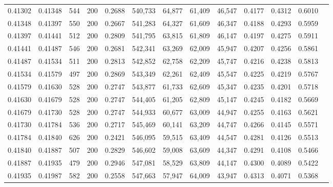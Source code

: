 \begin{tabular}{rrrrrrrrrrrrr}
0.41302 & 0.41348 &    544 & 200 &                                     0.2688 & 540,733 &  64,877 &  61,409 &  46,547 & 0.4177 & 0.4312 & 0.6010 \\
0.41348 & 0.41397 &    550 & 200 &                                     0.2667 & 541,283 &  64,327 &  61,609 &  46,347 & 0.4188 & 0.4293 & 0.5959 \\
0.41397 & 0.41441 &    512 & 200 &                                     0.2809 & 541,795 &  63,815 &  61,809 &  46,147 & 0.4197 & 0.4275 & 0.5911 \\
0.41441 & 0.41487 &    546 & 200 &                                     0.2681 & 542,341 &  63,269 &  62,009 &  45,947 & 0.4207 & 0.4256 & 0.5861 \\
0.41487 & 0.41534 &    511 & 200 &                                     0.2813 & 542,852 &  62,758 &  62,209 &  45,747 & 0.4216 & 0.4238 & 0.5813 \\
0.41534 & 0.41579 &    497 & 200 &                                     0.2869 & 543,349 &  62,261 &  62,409 &  45,547 & 0.4225 & 0.4219 & 0.5767 \\
0.41579 & 0.41630 &    528 & 200 &                                     0.2747 & 543,877 &  61,733 &  62,609 &  45,347 & 0.4235 & 0.4201 & 0.5718 \\
0.41630 & 0.41679 &    528 & 200 &                                     0.2747 & 544,405 &  61,205 &  62,809 &  45,147 & 0.4245 & 0.4182 & 0.5669 \\
0.41679 & 0.41730 &    528 & 200 &                                     0.2747 & 544,933 &  60,677 &  63,009 &  44,947 & 0.4255 & 0.4163 & 0.5621 \\
0.41730 & 0.41784 &    536 & 200 &                                     0.2717 & 545,469 &  60,141 &  63,209 &  44,747 & 0.4266 & 0.4145 & 0.5571 \\
0.41784 & 0.41840 &    626 & 200 &                                     0.2421 & 546,095 &  59,515 &  63,409 &  44,547 & 0.4281 & 0.4126 & 0.5513 \\
0.41840 & 0.41887 &    507 & 200 &                                     0.2829 & 546,602 &  59,008 &  63,609 &  44,347 & 0.4291 & 0.4108 & 0.5466 \\
0.41887 & 0.41935 &    479 & 200 &                                     0.2946 & 547,081 &  58,529 &  63,809 &  44,147 & 0.4300 & 0.4089 & 0.5422 \\
0.41935 & 0.41987 &    582 & 200 &                                     0.2558 & 547,663 &  57,947 &  64,009 &  43,947 & 0.4313 & 0.4071 & 0.5368 \\

\end{tabular}
